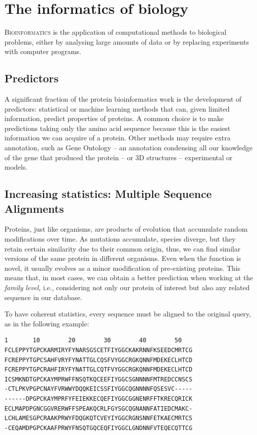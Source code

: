 \chapter{The informatics of biology}
\lettrine[lines=3, lhang=0.3, nindent=0em]{\color{Maroon}B}{ioinformatics}
is the application of computational methods to biological problems,
either by analysing large amounts of data or by replacing experiments with computer programs.

\section{Predictors}
A significant fraction of the protein bioinformatics work is the development of predictors: statistical or machine learning methods that can, given limited information, predict properties of proteins.
A common choice is to make predictions taking only the amino acid sequence because this is the easiest information we can acquire of a protein.
Other methods may require extra annotation, such as Gene Ontology -- an annotation condensing all our knowledge of the gene that produced the protein -- or 3D structures -- experimental or models.

\section[Multiple Sequence Alignments]{Increasing statistics: Multiple Sequence Alignments}
Proteins, just like organisms, are products of evolution that accumulate random modifications over time.
As mutations accumulate, species diverge, but they retain certain similarity due to their common origin, thus, we can find similar versions of the same protein in different organisms.
Even when the function is novel, it usually evolves as a minor modification of pre-existing proteins.
This means that, in most cases, we can obtain a better prediction when working at the \emph{family level,}
i.e., considering not only our protein of interest but also any related sequence in our database.

To have coherent statistics, every sequence must be aligned to the original query, as in the following example:

\begin{center}
\sidenote{\phantom{x}}
\sidenote{\phantom{x}}
\sidenote{\phantom{x}}
\begin{Verbatim}[fontsize=\small, xleftmargin=3em]
1       10        20        30        40        50   
FCLEPPYTGPCKARMIRYFYNARSGSCETFIYGGCKAKRNNFKSEEDCMRTCG
FCREPPYTGPCSAHFVRYFYNATTGLCQSFVYGGCRGKQNNFMDEKECLHTCD
FCREPPYTGPCRAHFIRYFYNATTGLCQTFVYGGCRGKQNNFMDEKECLHTCD
ICSMKNDTGPCKAYMPRWFFNSQTKQCEEFIYGGCSGNNNNFMTREDCCNSCS
-CTLPKVPGPCNAYFVRWWYDQQKEICSSFIYGGCQGNNNNFQSESVC-----
------DPGPCKAYMPRFYFEIEKKECQEFIYGGCGGNENRFFTKRECQRICK
ECLMAPDPGNCGGVRERWFFSPEAKQCRLFGYSGCQGNANNFATIEDCMAKC-
LCHLAMESGPCRAAKPRWYFDQGKQTCVEYIYGGCRGNSNNFETKAECMRTCS
-CEQAMDPGPCKAAFPRWYFNSQTGQCEQFIYGGCLGNDNNFVTEQECQTTCG
\end{Verbatim}
\end{center}

